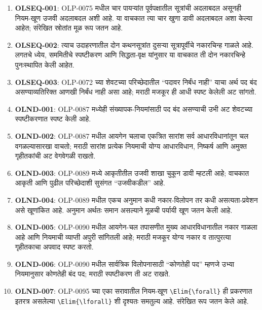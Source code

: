 \documentclass[11pt,a4paper,openany]{book}
\theoremstyle{definition}
\begin{document}
\begin{enumerate}
\item \textbf{OLSEQ-001}: OLP-0075 मधील चार पायऱ्यांत पूर्वपक्षातील
सूत्रांची अदलाबदल असूनही नियम-खूण उजवी अदलाबदल अशी आहे. या वाचकात त्या
चार खुणा डावी अदलाबदल अशा केल्या आहेत; संरेखित स्रोतांत मूळ रूप जतन आहे.
\item \textbf{OLSEQ-002}: त्याच उदाहरणातील दोन कथनसूत्रांत दुसऱ्या
सूत्रापूर्वीचे नकारचिन्ह गाळले आहे. लगतचे ध्येय, सममितीचे स्पष्टीकरण आणि
सिद्धता-वृक्ष यांनुसार या वाचकात ती दोन नकारचिन्हे पुनःस्थापित केली आहेत.
\item \textbf{OLSEQ-003}: OLP-0072 च्या शेवटच्या परिच्छेदातील ``पदावर
निर्बंध नाही'' याचा अर्थ पद बंद असण्याव्यतिरिक्त आणखी निर्बंध नाही असा आहे;
मराठी मजकूर ही आधी स्पष्ट केलेली अट सांगतो.
\item \textbf{OLND-001}: OLP-0087 मध्येही संख्यापक-नियमांसाठी पद बंद
असण्याची उभी अट शेवटच्या स्पष्टीकरणात स्पष्ट केली आहे.
\item \textbf{OLND-002}: OLP-0087 मधील आयगेन चलाचा एकत्रित सारांश सर्व
आधारविधानांतून चल वगळल्यासारखा वाचतो; मराठी सारांश प्रत्येक नियमाची योग्य
आधारविधान, निष्कर्ष आणि अमुक्त गृहीतकांची अट वेगवेगळी राखतो.
\item \textbf{OLND-003}: OLP-0089 मध्ये आकृतीतील उजवी शाखा चुकून डावी
म्हटली आहे; वाचकात आकृती आणि पुढील परिच्छेदाशी सुसंगत ``उजवीकडील'' आहे.
\item \textbf{OLND-004}: OLP-0089 मधील एकच अनुमान कधी नकार-विलोपन तर
कधी असत्यता-प्रवेशन असे खूणांकित आहे. अनुमान अर्थतः समान असल्याने मूळची
पर्यायी खूण जतन केली आहे.
\item \textbf{OLND-005}: OLP-0090 मधील आयगेन-चल तपासणीत मुख्य
आधारविधानातील नकार गाळला आहे आणि नियमाची व्याप्ती अपुरी सांगितली आहे;
मराठी मजकूर योग्य नकार व तात्पुरत्या गृहीतकाचा अपवाद स्पष्ट करतो.
\item \textbf{OLND-006}: OLP-0090 मधील सार्वत्रिक विलोपनासाठी ``कोणतेही
पद'' म्हणजे उभ्या नियमानुसार कोणतेही बंद पद; मराठी स्पष्टीकरण ती अट राखते.
\item \textbf{OLND-007}: OLP-0095 च्या एका सरावातील नियम-खूण
\verb|\Elim{\forall}| ही प्रकरणात इतरत्र असलेल्या
\verb|\Elim{\lforall}| शी दृश्यतः समतुल्य आहे. संरेखित रूप जतन केले आहे.


\end{enumerate}
\end{document}
